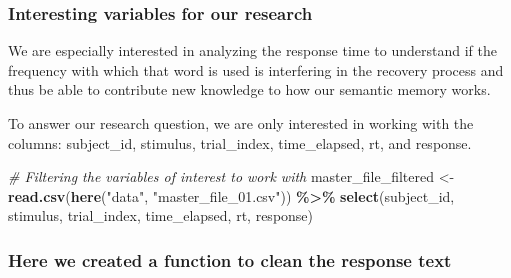 \documentclass[
]{article}
\newenvironment{Shaded}{\begin{snugshade}}{\end{snugshade}}
\newcommand{\CommentTok}[1]{\textcolor[rgb]{0.56,0.35,0.01}{\textit{#1}}}
\newcommand{\FunctionTok}[1]{\textcolor[rgb]{0.13,0.29,0.53}{\textbf{#1}}}
\newcommand{\NormalTok}[1]{#1}
\newcommand{\OtherTok}[1]{\textcolor[rgb]{0.56,0.35,0.01}{#1}}
\newcommand{\SpecialCharTok}[1]{\textcolor[rgb]{0.81,0.36,0.00}{\textbf{#1}}}
\newcommand{\StringTok}[1]{\textcolor[rgb]{0.31,0.60,0.02}{#1}}
\begin{document}
\hypertarget{interesting-variables-for-our-research}{%
\subsubsection{Interesting variables for our
research}\label{interesting-variables-for-our-research}}

We are especially interested in analyzing the response time to
understand if the frequency with which that word is used is interfering
in the recovery process and thus be able to contribute new knowledge to
how our semantic memory works.

To answer our research question, we are only interested in working with
the columns: subject\_id, stimulus, trial\_index, time\_elapsed, rt, and
response.

\begin{Shaded}
\begin{Highlighting}[]
\CommentTok{\# Filtering the variables of interest to work with}
\NormalTok{master\_file\_filtered }\OtherTok{\textless{}{-}} \FunctionTok{read.csv}\NormalTok{(}\FunctionTok{here}\NormalTok{(}\StringTok{"data"}\NormalTok{, }\StringTok{"master\_file\_01.csv"}\NormalTok{)) }\SpecialCharTok{\%\textgreater{}\%} 
  \FunctionTok{select}\NormalTok{(subject\_id, stimulus, trial\_index, time\_elapsed, rt, response)}
\end{Highlighting}
\end{Shaded}

\hypertarget{here-we-created-a-function-to-clean-the-response-text}{%
\subsubsection{Here we created a function to clean the response
text}\label{here-we-created-a-function-to-clean-the-response-text}}
\end{document}

